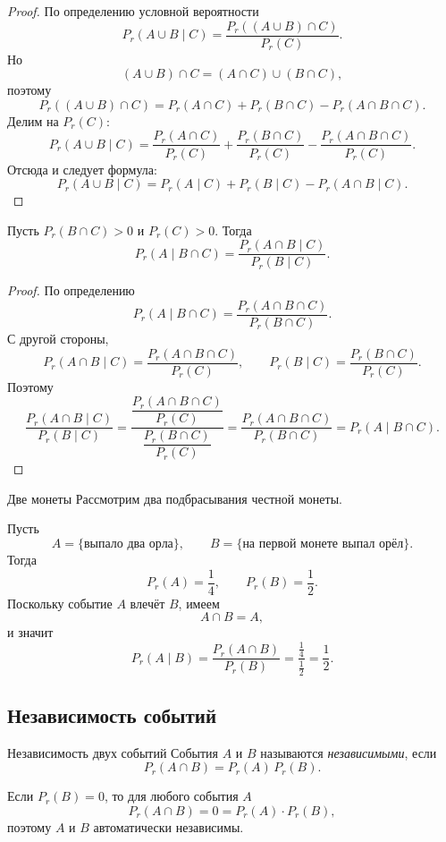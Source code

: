 \begin{proof}
	По определению условной вероятности
	\[
	P_r(A\cup B\mid C)
	=
	\frac{P_r((A\cup B)\cap C)}{P_r(C)}.
	\]
	Но
	\[
	(A\cup B)\cap C=(A\cap C)\cup(B\cap C),
	\]
	поэтому
	\[
	P_r((A\cup B)\cap C)
	=
	P_r(A\cap C)+P_r(B\cap C)-P_r(A\cap B\cap C).
	\]
	Делим на \(P_r(C)\):
	\[
	P_r(A\cup B\mid C)
	=
	\frac{P_r(A\cap C)}{P_r(C)}
	+
	\frac{P_r(B\cap C)}{P_r(C)}
	-
	\frac{P_r(A\cap B\cap C)}{P_r(C)}.
	\]
	Отсюда и следует формула:
	\[
	P_r(A\cup B\mid C)
	=
	P_r(A\mid C)+P_r(B\mid C)-P_r(A\cap B\mid C).
	\]
\end{proof}

\begin{Statement}{}{}
	Пусть \(P_r(B\cap C)>0\) и \(P_r(C)>0\). Тогда
	\[
	P_r(A\mid B\cap C)=\frac{P_r(A\cap B\mid C)}{P_r(B\mid C)}.
	\]
\end{Statement}

\begin{proof}
	По определению
	\[
	P_r(A\mid B\cap C)=\frac{P_r(A\cap B\cap C)}{P_r(B\cap C)}.
	\]
	С другой стороны,
	\[
	P_r(A\cap B\mid C)=\frac{P_r(A\cap B\cap C)}{P_r(C)},
	\qquad
	P_r(B\mid C)=\frac{P_r(B\cap C)}{P_r(C)}.
	\]
	Поэтому
	\[
	\frac{P_r(A\cap B\mid C)}{P_r(B\mid C)}
	=
	\frac{\dfrac{P_r(A\cap B\cap C)}{P_r(C)}}{\dfrac{P_r(B\cap C)}{P_r(C)}}
	=
	\frac{P_r(A\cap B\cap C)}{P_r(B\cap C)}
	=
	P_r(A\mid B\cap C).
	\]
\end{proof}

\begin{Example}{Две монеты}{}
	Рассмотрим два подбрасывания честной монеты.
	
	Пусть
	\[
	A=\{\text{выпало два орла}\},
	\qquad
	B=\{\text{на первой монете выпал орёл}\}.
	\]
	Тогда
	\[
	P_r(A)=\frac14,
	\qquad
	P_r(B)=\frac12.
	\]
	Поскольку событие \(A\) влечёт \(B\), имеем
	\[
	A\cap B=A,
	\]
	и значит
	\[
	P_r(A\mid B)=\frac{P_r(A\cap B)}{P_r(B)}
	=
	\frac{\frac14}{\frac12}
	=
	\frac12.
	\]
\end{Example}

\subsection{Независимость событий}

\begin{Definition}{Независимость двух событий}{}
	События \(A\) и \(B\) называются \textit{независимыми}, если
	\[
	P_r(A\cap B)=P_r(A)\,P_r(B).
	\]
\end{Definition}

\begin{Remark}{}{}
	Если \(P_r(B)=0\), то для любого события \(A\)
	\[
	P_r(A\cap B)=0=P_r(A)\cdot P_r(B),
	\]
	поэтому \(A\) и \(B\) автоматически независимы.
\end{Remark}


